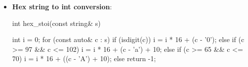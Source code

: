 \documentclass{report}
\begin{document}
\begin{itemize}
\begin{cppcode}
{                    if (s[0] == '-') negative = true;

                    for (const auto& c : s)  {
                        if (isdigit(c)) { i = (i * 10) + (c - '0'); }
                        else return -1;
                    }

                    return negative ? -i : i;
                }
            \end{cppcode}
        \item \textbf{Hex string to int conversion}:
            \bigbreak \noindent 
            \begin{cppcode}
             int hex_stoi(const string& s) {
                int i = 0;
                for (const auto& c : s) {
                    if (isdigit(c)) {
                        i = i * 16 + (c - '0');
                    } else if (c >= 97 && c <= 102) {
                        i = i * 16 + (c - 'a') + 10;
                    } else if (c >= 65 && c <= 70) {
                        i = i * 16 + ((c - 'A') + 10);
                    } else return -1;
                }

}
\end{cppcode}
\end{itemize}
\end{document}
